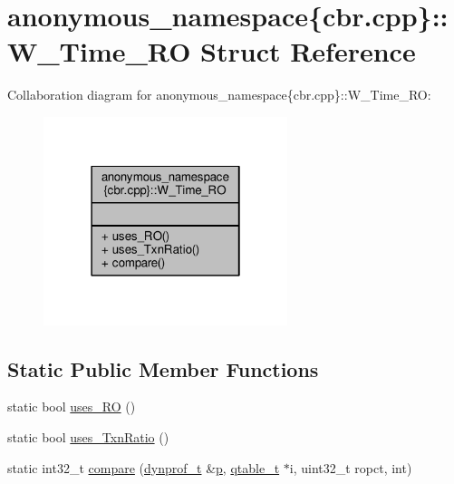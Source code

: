 \hypertarget{structanonymous__namespace_02cbr_8cpp_03_1_1W__Time__RO}{\section{anonymous\-\_\-namespace\{cbr.\-cpp\}\-:\-:W\-\_\-\-Time\-\_\-\-R\-O Struct Reference}
\label{structanonymous__namespace_02cbr_8cpp_03_1_1W__Time__RO}
}


Collaboration diagram for anonymous\-\_\-namespace\{cbr.\-cpp\}\-:\-:W\-\_\-\-Time\-\_\-\-R\-O\-:
\nopagebreak
\begin{figure}[H]
\begin{center}
\leavevmode
\includegraphics[width=202pt]{structanonymous__namespace_02cbr_8cpp_03_1_1W__Time__RO__coll__graph}
\end{center}
\end{figure}
\subsection*{Static Public Member Functions}
\begin{DoxyCompactItemize}
\item 
static bool \hyperlink{structanonymous__namespace_02cbr_8cpp_03_1_1W__Time__RO_abfe6540abef7cc489aef15519ee86603}{uses\-\_\-\-R\-O} ()
\item 
static bool \hyperlink{structanonymous__namespace_02cbr_8cpp_03_1_1W__Time__RO_ab2d83536c1acb68075232db8dde274f9}{uses\-\_\-\-Txn\-Ratio} ()
\item 
static int32\-\_\-t \hyperlink{structanonymous__namespace_02cbr_8cpp_03_1_1W__Time__RO_a7f58d1b257317cd174eef5c3d7ad450c}{compare} (\hyperlink{structstm_1_1dynprof__t}{dynprof\-\_\-t} \&\hyperlink{counted__ptr_8hpp_a5c9f59d7c24e3fd6ceae319a968fc3e0}{p}, \hyperlink{structstm_1_1qtable__t}{qtable\-\_\-t} $\ast$i, uint32\-\_\-t ropct, int)
\end{DoxyCompactItemize}


